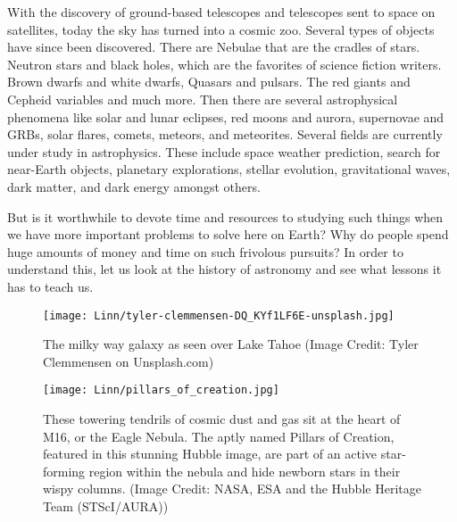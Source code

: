 \documentclass{../template/texnote}
\begin{document}
With the discovery of ground-based telescopes and telescopes sent to space on satellites, today the sky has turned into a cosmic zoo. Several types of objects have since been discovered. There are Nebulae that are the cradles of stars. Neutron stars and black holes, which are the favorites of science fiction writers. Brown dwarfs and white dwarfs, Quasars and pulsars. The red giants and Cepheid variables and much more. Then there are several astrophysical phenomena like solar and lunar eclipses, red moons and aurora, supernovae and GRBs, solar flares, comets, meteors, and meteorites. 
Several fields are currently under study in astrophysics. These include space weather prediction, search for near-Earth objects, planetary explorations, stellar evolution, gravitational waves, dark matter, and dark energy amongst others. 

But is it worthwhile to devote time and resources to studying such things when we have more important problems to solve here on Earth?  Why do people spend huge amounts of money and time on such frivolous pursuits? In order to understand this, let us look at the history of astronomy and see what lessons it has to teach us. 

\begin{figure}
    \centering
    \texttt{[image: Linn/tyler-clemmensen-DQ\_KYf1LF6E-unsplash.jpg]}
    \caption{The milky way galaxy as seen over Lake Tahoe (Image Credit: 
Tyler Clemmensen on Unsplash.com)}
    \label{fig:milkyway}
\end{figure}




\begin{figure}
    \centering
    \texttt{[image: Linn/pillars\_of\_creation.jpg]}
    \caption{These towering tendrils of cosmic dust and gas sit at the heart of M16, or the Eagle Nebula. The aptly named Pillars of Creation, featured in this stunning Hubble image, are part of an active star-forming region within the nebula and hide newborn stars in their wispy columns. (Image Credit: NASA, ESA and the Hubble Heritage Team (STScI/AURA))}
    \label{fig:nebulae}
\end{figure}
\end{document}
